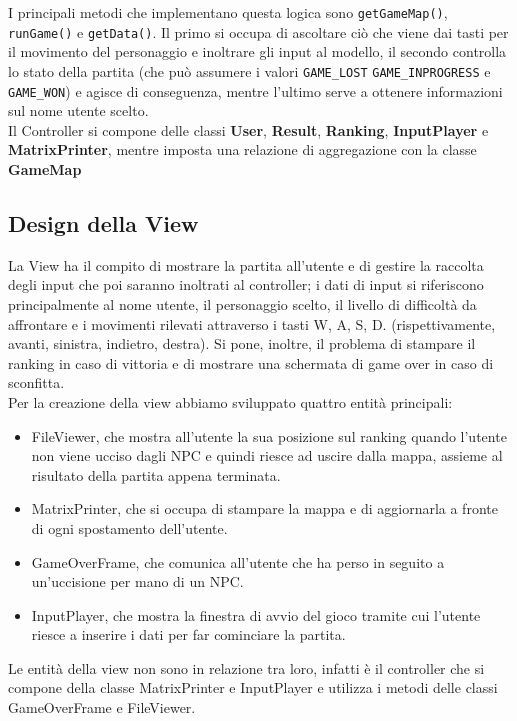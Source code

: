 \documentclass[12pt, letterpaper]{article}
\begin{document}
            I principali metodi che implementano questa logica sono \verb|getGameMap()|, \verb|runGame()| e \verb|getData()|. Il primo si occupa di ascoltare ciò che viene dai tasti per il movimento del personaggio e inoltrare gli input al modello, il secondo controlla lo stato della partita (che può assumere i valori \verb|GAME_LOST| \verb|GAME_INPROGRESS| e \verb|GAME_WON|) e agisce di conseguenza, mentre l'ultimo serve a ottenere informazioni sul nome utente scelto.\\
            Il Controller si compone delle classi \textbf{User}, \textbf{Result}, \textbf{Ranking}, \textbf{InputPlayer} e \textbf{MatrixPrinter}, mentre imposta una relazione di aggregazione con la classe \textbf{GameMap}
    \newpage
    \subsection{Design della View}
        La View ha il compito di mostrare la partita all'utente e di gestire la raccolta degli input che poi saranno inoltrati al controller; i dati di input si riferiscono principalmente al nome utente, il personaggio scelto, il livello di difficoltà da affrontare e i movimenti rilevati attraverso i tasti W, A, S, D. (rispettivamente, avanti, sinistra, indietro, destra). Si pone, inoltre, il problema di stampare il ranking in caso di vittoria e di mostrare una schermata di game over in caso di sconfitta.\\
        Per la creazione della view abbiamo sviluppato quattro entità principali:
        \begin{itemize}
            \item FileViewer, che mostra all'utente la sua posizione sul ranking quando l'utente non viene ucciso dagli NPC e quindi riesce
            ad uscire dalla mappa, assieme al risultato della partita appena terminata.
            \item MatrixPrinter, che si occupa di stampare la mappa e di aggiornarla a fronte di ogni spostamento dell'utente.
            \item GameOverFrame, che comunica all'utente che ha perso in seguito a un'uccisione per mano di un NPC.
            \item InputPlayer, che mostra la finestra di avvio del gioco tramite cui l'utente riesce a inserire i dati per far cominciare la partita.
        \end{itemize}
        Le entità della view non sono in relazione tra loro, infatti è il controller che si compone della classe MatrixPrinter e InputPlayer e utilizza i metodi delle classi GameOverFrame e FileViewer.
\newpage
\end{document}
